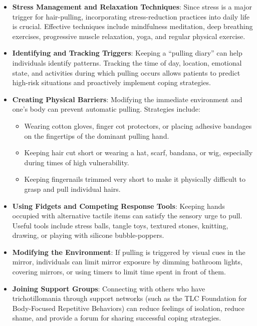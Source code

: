 \begin{itemize}
    \item \textbf{Stress Management and Relaxation Techniques}: Since stress is a major trigger for hair-pulling, incorporating stress-reduction practices into daily life is crucial. Effective techniques include mindfulness meditation, deep breathing exercises, progressive muscle relaxation, yoga, and regular physical exercise.
    \item \textbf{Identifying and Tracking Triggers}: Keeping a ``pulling diary'' can help individuals identify patterns. Tracking the time of day, location, emotional state, and activities during which pulling occurs allows patients to predict high-risk situations and proactively implement coping strategies.
    \item \textbf{Creating Physical Barriers}: Modifying the immediate environment and one's body can prevent automatic pulling. Strategies include:
    \begin{itemize}
        \item Wearing cotton gloves, finger cot protectors, or placing adhesive bandages on the fingertips of the dominant pulling hand.
        \item Keeping hair cut short or wearing a hat, scarf, bandana, or wig, especially during times of high vulnerability.
        \item Keeping fingernails trimmed very short to make it physically difficult to grasp and pull individual hairs.
    \end{itemize}
    \item \textbf{Using Fidgets and Competing Response Tools}: Keeping hands occupied with alternative tactile items can satisfy the sensory urge to pull. Useful tools include stress balls, tangle toys, textured stones, knitting, drawing, or playing with silicone bubble-poppers.
    \item \textbf{Modifying the Environment}: If pulling is triggered by visual cues in the mirror, individuals can limit mirror exposure by dimming bathroom lights, covering mirrors, or using timers to limit time spent in front of them.
    \item \textbf{Joining Support Groups}: Connecting with others who have trichotillomania through support networks (such as the TLC Foundation for Body-Focused Repetitive Behaviors) can reduce feelings of isolation, reduce shame, and provide a forum for sharing successful coping strategies.
\end{itemize}


